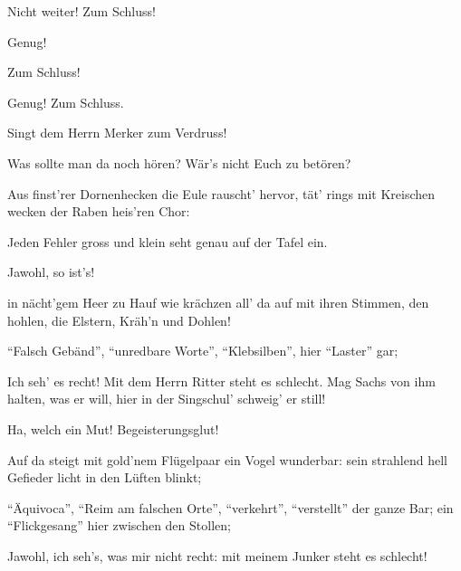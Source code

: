 \begin{drama}


\Beckmesserspeaks
Nicht weiter! Zum Schluss!

\speaker{\Ortel, \Moser, \Vogelgesang, \Nachtigall}

Genug!

\speaker{\Zorn, \Eisslinger}
Zum Schluss!

\Kothnerspeaks
Genug! Zum Schluss.

\Sachsspeaks
{}

Singt dem Herrn Merker zum Verdruss!

\Beckmesserspeaks
Was sollte man da noch hören?
Wär's nicht Euch zu betören?



\Waltherspeaks
Aus finst'rer Dornenhecken
die Eule rauscht' hervor,
tät' rings mit Kreischen wecken
der Raben heis'ren Chor:

\Beckmesserspeaks
Jeden Fehler gross und klein
seht genau auf der Tafel ein.


Jawohl, so ist's!

\Waltherspeaks
in nächt'gem Heer zu Hauf
wie krächzen all' da auf
mit ihren Stimmen, den hohlen,
die Elstern, Kräh'n und Dohlen!

\Beckmesserspeaks
``Falsch Gebänd'', ``unredbare Worte'',
``Klebsilben'', hier ``Laster'' gar;


Ich seh' es recht!
Mit dem Herrn Ritter steht es schlecht.
Mag Sachs von ihm halten, was er will,
hier in der Singschul' schweig' er still!

\Sachsspeaks
{}

Ha, welch ein Mut!
Begeisterungsglut!

\Waltherspeaks
Auf da steigt
mit gold'nem Flügelpaar
ein Vogel wunderbar:
sein strahlend hell Gefieder
licht in den Lüften blinkt;

\Beckmesserspeaks
``Äquivoca'', ``Reim am falschen Orte'',
``verkehrt'', ``verstellt'' der ganze Bar;
ein ``Flickgesang'' hier zwischen den Stollen;

\Pognerspeaks
Jawohl, ich seh's, was mir nicht recht:
mit meinem Junker steht es schlecht!


\end{drama}
